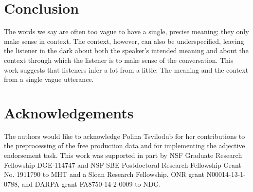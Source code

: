 \documentclass[doc, floatsintext]{apa6}
\begin{document}
%
%
%


\section{Conclusion}

The words we say are often too vague to have a single, precise meaning; they only make sense in context.
The context, however, can also be
underspecified, leaving the listener in the dark about both the
speaker's intended meaning and about the context through which the
listener is to make sense of the conversation. This work suggests that listeners infer a lot from a little:
The meaning and the context from a single vague utterance.


\section{Acknowledgements}

The authors would like to acknowledge Polina Tsvilodub for her contributions to the preprocessing of the free production data and for  implementing the adjective endorsement task.
This work was supported in part by NSF Graduate Research Fellowship
DGE-114747 and NSF SBE Postdoctoral Research Fellowship Grant No. 1911790 to  MHT and a Sloan Research Fellowship, ONR grant N00014-13-1-0788, and DARPA grant FA8750-14-2-0009 to NDG.
\end{document}
